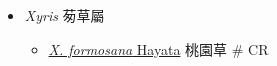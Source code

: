 
  \begin{itemize}
 \item[] \textit{Xyris} 茐草屬
                                
  \begin{itemize}
        \item[] \href{http://www.theplantlist.org/tpl1.1/search?q=Xyris+formosana}{\textit{X. formosana} Hayata}   桃園草  \# CR
  \end{itemize}
  \end{itemize}
